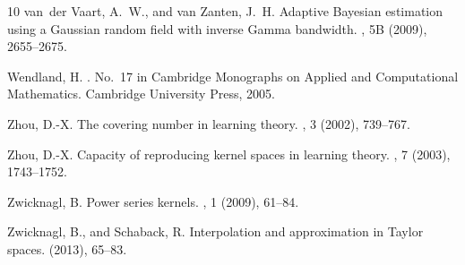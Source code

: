 \documentclass{mcom-l}
\numberwithin{equation}{section}
\numberwithin{theorem}{section} %
\begin{document}
\begin{thebibliography}{10}
{\sc van~der Vaart, A.~W., and van Zanten, J.~H.}
\newblock Adaptive {B}ayesian estimation using a {G}aussian random field with
  inverse {G}amma bandwidth.
, 5B (2009), 2655--2675.

{\sc Wendland, H.}
.
\newblock No.~17 in Cambridge Monographs on Applied and Computational
  Mathematics. Cambridge University Press, 2005.

{\sc Zhou, D.-X.}
\newblock The covering number in learning theory.
, 3 (2002), 739--767.

{\sc Zhou, D.-X.}
\newblock Capacity of reproducing kernel spaces in learning theory.
, 7 (2003),
  1743--1752.

{\sc Zwicknagl, B.}
\newblock Power series kernels.
, 1 (2009), 61--84.

{\sc Zwicknagl, B., and Schaback, R.}
\newblock Interpolation and approximation in {T}aylor spaces.
 (2013), 65--83.

\end{thebibliography}
\end{document}
